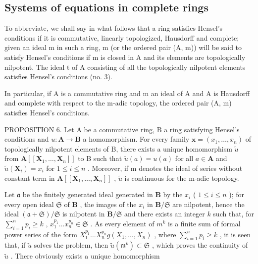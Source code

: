 \subsection{Systems of equations in complete rings}

To abbreviate, we shall say in what follows that a ring satisfies Hensel's conditions if it is commutative, linearly topologized, Hausdorff and complete; given an ideal m in such a ring, m (or the ordered pair (A, m)) will be said to satisfy Hensel's conditions if m is closed in A and its elements are topologically nilpotent. The ideal t of A consisting of all the topologically nilpotent elements satisfies Hensel's conditions (no. 3).

In particular, if A is a commutative ring and m an ideal of A and A is Hausdorff and complete with respect to the m-adic topology, the ordered pair (A, m) satisfies Hensel's conditions.

PROPOSITION 6. Let A be a commutative ring, B a ring satisfying Hensel's conditions and \(u: \mathbf{A} \to \mathbf{B}\) a homomorphism. For every family \(\mathbf{x} = (x_1, \ldots, x_n)\) of topologically nilpotent elements of B, there exists a unique homomorphism \(\tilde{u}\) from \(\mathbf{A}[[\mathbf{X}_1, \ldots, \mathbf{X}_n]]\) to B such that \(\tilde{u}(a) = u(a)\) for all \(a \in \mathbf{A}\) and \(\tilde{u}(\mathbf{X}_i) = x_i\) for \(1 \leqslant i \leqslant n\) . Moreover, if m denotes the ideal of series without constant term in \(\mathbf{A}[[\mathbf{X}_1, \ldots, \mathbf{X}_n]]\) , \(\tilde{u}\) is continuous for the m-adic topology.

Let \(\mathfrak{a}\) be the finitely generated ideal generated in \(\mathbf{B}\) by the \(x_{i}\) ( \(1 \leqslant i \leqslant n\) ); for every open ideal \(\mathfrak{S}\) of \(\mathbf{B}\) , the images of the \(x_{i}\) in \(\mathbf{B}/\mathfrak{S}\) are nilpotent, hence the ideal \((\mathfrak{a} + \mathfrak{S})/\mathfrak{S}\) is nilpotent in \(\mathbf{B}/\mathfrak{S}\) and there exists an integer \(k\) such that, for \(\sum_{i=1}^{n} p_{i} \geqslant k\) , \(x_{1}^{p_{1}} \ldots x_{n}^{p_{n}} \in \mathfrak{S}\) . As every element of \(m^{k}\) is a finite sum of formal power series of the form \(X_{1}^{p_{1}} \ldots X_{n}^{p_{n}} g(X_{1}, \ldots, X_{n})\) , where \(\sum_{i=1}^{n} p_{i} \geqslant k\) , it is seen that, if \(\tilde{u}\) solves the problem, then \(\tilde{u}(\mathfrak{m}^k) \subset \mathfrak{S}\) , which proves the continuity of \(\tilde{u}\) . There obviously exists a unique homomorphism

